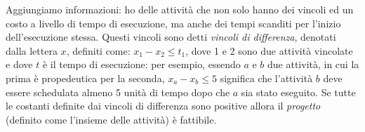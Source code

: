 Aggiungiamo informazioni: ho delle attività che non solo hanno dei vincoli ed un costo a livello di tempo di esecuzione, ma anche dei tempi scanditi per l'inizio dell'esecuzione stessa. Questi vincoli sono detti \textit{vincoli di differenza}, denotati dalla lettera $x$, definiti come: $x_1 - x_2 \leq t_1$, dove 1 e 2 sono due attività vincolate e dove $t$ è il tempo di esecuzione: per esempio, essendo $a$ e $b$ due attività, in cui la prima è propedeutica per la seconda, $x_a - x_b \leq 5$ significa che l'attività $b$ deve essere schedulata almeno 5 unità di tempo dopo che $a$ sia stato eseguito. Se tutte le costanti definite dai vincoli di differenza sono positive allora il \textit{progetto} (definito come l'insieme delle attività) è fattibile.